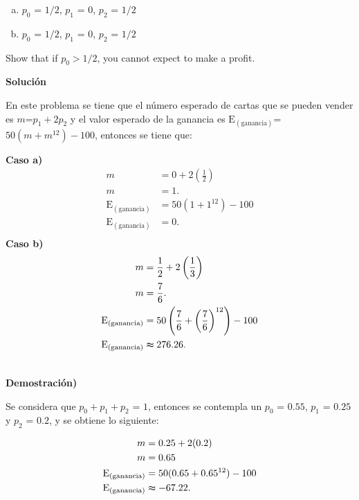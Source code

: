 \documentclass{article}
\begin{document}
\begin{enumerate}[a)]
    \item $p_{0}$ = $1/2$, $p_{1}$ = $0$, $p_{2}$ = $1/2$
    \item $p_{0}$ = $1/2$, $p_{1}$ = $0$, $p_{2}$ = $1/2$ 
\end{enumerate}
\noindent Show that if $p_{0} > 1/2$, you cannot expect to make a profit.

\noindent \textbf{Solución}

\noindent En este problema se tiene que el número esperado de cartas que se pueden vender es $m$=$p_{1}+2p_{2}$ y el valor esperado de la ganancia es $\text{E}_{(\text{ganancia})}$= $50(m+m^12)-100$, entonces se tiene que:

\noindent \textbf{Caso a)}
    \begin{align}
    \nonumber
        m & = 0 + 2\left(\frac{1}{2}\right) \\ \nonumber
        m & = 1. \\ \nonumber
        \text{E}_{(\text{ganancia})} & = 50(1+1^{12})-100 \\ \nonumber
         \text{E}_{(\text{ganancia})} & = 0. \\ \nonumber
    \end{align}
\noindent \textbf{Caso b)} 
    \begin{align}
    \nonumber
        m & = \frac{1}{2}+ 2\left(\frac{1}{3}\right)\\ \nonumber
        m & = \frac{7}{6}. \\ \nonumber
        \text{E}_{(\text{ganancia})} & = 50 \left(\frac{7}{6}+\left(\frac{7}{6} \right)^{12} \right)-100 \\ \nonumber
         \text{E}_{(\text{ganancia})} & \thickapprox 276.26. \\ \nonumber
    \end{align}  

\noindent \textbf{Demostración)} 

\noindent Se considera que $p_{0} + p_{1} + p_{2}$ = $1$, entonces se contempla un $p_{0}$ = $0.55$, $p_{1}$ = $0.25$ y $p_{2}$ = $0.2$, y se obtiene lo siguiente:

\begin{align}
\nonumber
    m & = 0.25 + 2(0.2) \\ \nonumber
    m & = 0.65 \\ \nonumber
    \text{E}_{(\text{ganancia})} & = 50(0.65+0.65^{12})-100 \\ \nonumber
    \text{E}_{(\text{ganancia})} & \thickapprox -67.22. \\ \nonumber
\end{align}
\end{document}
